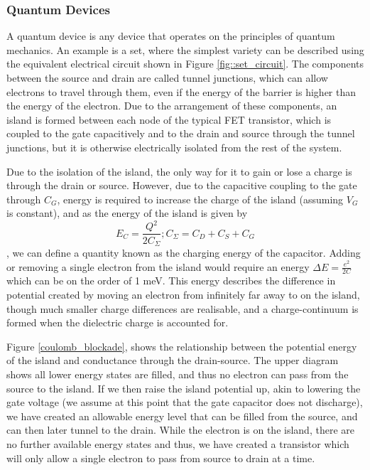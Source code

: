 \subsubsection{Quantum Devices}
A quantum device is any device that operates on the principles of quantum mechanics. An example is a \gls{set}, where the simplest variety can be described using the equivalent electrical circuit \cite{devoret2000amplifying} shown in Figure \ref{fig::set_circuit}. The components between the source and drain are called tunnel junctions, which can allow electrons to travel through them, even if the energy of the barrier is higher than the energy of the electron. Due to the arrangement of these components, an island is formed between each node of the typical FET transistor, which is coupled to the gate capacitively and to the drain and source through the tunnel junctions, but it is otherwise electrically isolated from the rest of the system.

Due to the isolation of the island, the only way for it to gain or lose a charge is through the drain or source. However, due to the capacitive coupling to the gate through $C_G$, energy is required to increase the charge of the island (assuming $V_G$ is constant), and as the energy of the island is given by $$E_C = \frac{Q^2}{2 C_\Sigma} ; C_\Sigma = C_D + C_S + C_G$$, we can define a quantity known as the charging energy of the capacitor. Adding or removing a single electron from the island would require an energy $\Delta E = \frac{e^2}{2 C}$ which can be on the order of 1 meV. This energy describes the difference in potential created by moving an electron from infinitely far away to on the island, though much smaller charge differences are realisable, and a charge-continuum is formed when the dielectric charge is accounted for.

Figure \ref{coulomb_blockade}, shows the relationship between the potential energy of the island and conductance through the drain-source. The upper diagram shows all lower energy states are filled, and thus no electron can pass from the source to the island. If we then raise the island potential up, akin to lowering the gate voltage (we assume at this point that the gate capacitor does not discharge), we have created an allowable energy level that can be filled from the source, and can then later tunnel to the drain. While the electron is on the island, there are no further available energy states and thus, we have created a transistor which will only allow a single electron to pass from source to drain at a time.

